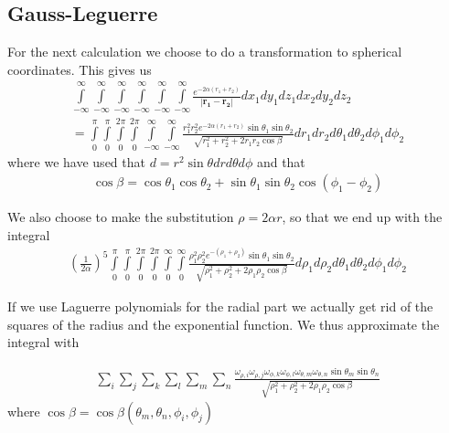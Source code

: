 \documentclass[11pt, a4paper]{article}
\begin{document}
\subsection{Gauss-Leguerre}
For the next calculation we choose to do a transformation to spherical coordinates. This gives us
\begin{gather}
\int\limits_{-\infty}^\infty\int\limits_{-\infty}^\infty\int\limits_{-\infty}^\infty\int\limits_{-\infty}^\infty\int\limits_{-\infty}^\infty\int\limits_{-\infty}^\infty \frac{e^{-2\alpha(r_1+r_2)}}{|\mathbf{r_1}-\mathbf{r_2}|} dx_1dy_1dz_1dx_2dy_2dz_2 \\
= \int\limits_{0}^\pi\int\limits_{0}^\pi\int\limits_{0}^{2\pi}\int\limits_{0}^{2\pi}\int\limits_{-\infty}^\infty\int\limits_{-\infty}^\infty \frac{r_1^2r_2^2e^{-2\alpha(r_1+r_2)}\sin{\theta_1}\sin\theta_2}{\sqrt{r_1^2+r_2^2+2r_1r_2\cos\beta}}dr_1dr_2d\theta_1d\theta_2d\phi_1d\phi_2 
\end{gather}
where we have used that $d\mathbf = r^2\sin\theta drd\theta d\phi$ and that
\begin{gather}
\cos \beta = \cos\theta_1\cos\theta_2+\sin\theta_1\sin\theta_2\cos(\phi_1-\phi_2)
\end{gather}

We also choose to make the substitution $\rho = 2\alpha r$, so that we end up with the integral
\begin{gather}
\left(\frac{1}{2\alpha}\right)^5\int\limits_{0}^\pi\int\limits_{0}^\pi\int\limits_{0}^{2\pi}\int\limits_{0}^{2\pi}\int\limits_{0}^\infty\int\limits_{0}^\infty \frac{\rho_1^2\rho_2^2e^{-(\rho_1+\rho_2)}\sin{\theta_1}\sin\theta_2}{\sqrt{\rho_1^2+\rho_2^2+2\rho_1\rho_2\cos\beta}}d\rho_1d\rho_2d\theta_1d\theta_2d\phi_1d\phi_2 
\end{gather}

If we use Laguerre polynomials for the radial part we actually get rid of the squares of the radius and the exponential function. We thus approximate the integral with

\begin{gather}
\sum\limits_i\sum\limits_j\sum\limits_k\sum\limits_l\sum\limits_m\sum\limits_n \frac{\omega_{\rho,i}\omega_{\rho,j}\omega_{\phi,k}\omega_{\phi,l}\omega_{\theta,m}\omega_{\theta,n}\sin{\theta_m}\sin\theta_n}{\sqrt{\rho_1^2+\rho_2^2+2\rho_1\rho_2\cos\beta}}
\end{gather}
where $\cos\beta = \cos\beta(\theta_m,\theta_n,\phi_i,\phi_j)$
\end{document}
